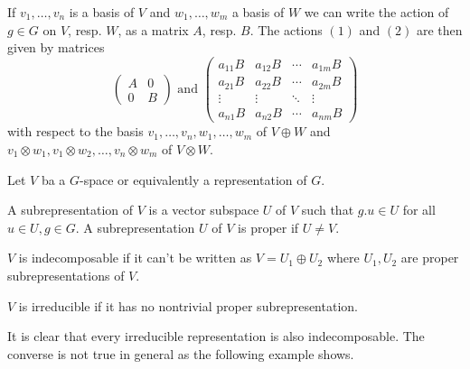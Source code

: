\begin{expls}
 If $v_1, \ldots, v_n$ is a basis of $V$ and $w_1, \ldots, w_m$ a basis of $W$ we can write the action of $g \in G$ on $V$, resp. $W$, as a matrix $A$, resp. $B$. The actions $(1)$ and $(2)$ are then given by matrices
 \[
  \begin{pmatrix}
   A & 0 \\
   0 & B
  \end{pmatrix}
  \text{ and }
  \begin{pmatrix}
   a_{11} B & a_{12} B & \cdots & a_{1m} B \\
   a_{21} B & a_{22} B & \cdots & a_{2m} B \\
    \vdots  &  \vdots  & \ddots &  \vdots  \\
   a_{n1} B & a_{n2} B & \cdots & a_{nm} B
  \end{pmatrix}
\]
with respect to the basis $v_1, \ldots, v_n, w_1, \ldots, w_m$ of $V \oplus W$ and $v_1 \otimes w_1, v_1 \otimes w_2, \ldots, v_n \otimes w_m$ of $V \otimes W$.
\end{expls}


\begin{defi}
  Let $V$ ba a $G$-space or equivalently a representation of $G$.

  A subrepresentation of $V$ is a vector subspace $U$ of $V$ such that $g.u \in U$ for all $u \in U, g \in G$. A subrepresentation $U$ of $V$ is proper if $U \neq V$.
  
  $V$ is indecomposable if it can’t be written as $V = U_1 \oplus U_2$ where $U_1, U_2$ are proper subrepresentations of $V$.
  
  $V$ is irreducible if it has no nontrivial proper subrepresentation.
\end{defi}

It is clear that every irreducible representation is also indecomposable. The converse is not true in general as the following example shows.

